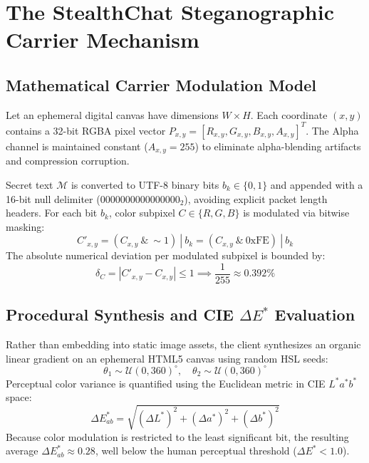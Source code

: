 \documentclass[conference]{IEEEtran}
\begin{document}
\section{The StealthChat Steganographic Carrier Mechanism}

\subsection{Mathematical Carrier Modulation Model}
Let an ephemeral digital canvas have dimensions $W \times H$. Each coordinate $(x,y)$ contains a 32-bit RGBA pixel vector $P_{x,y} = [R_{x,y}, G_{x,y}, B_{x,y}, A_{x,y}]^T$. The Alpha channel is maintained constant ($A_{x,y} = 255$) to eliminate alpha-blending artifacts and compression corruption.

Secret text $\mathcal{M}$ is converted to UTF-8 binary bits $b_k \in \{0, 1\}$ and appended with a 16-bit null delimiter ($0000000000000000_2$), avoiding explicit packet length headers. For each bit $b_k$, color subpixel $C \in \{R, G, B\}$ is modulated via bitwise masking:
\begin{equation}
    C'_{x,y} = (C_{x,y} \ \& \ \sim 1) \ | \ b_k = (C_{x,y} \ \& \ 0\text{xFE}) \ | \ b_k
\end{equation}
The absolute numerical deviation per modulated subpixel is bounded by:
\begin{equation}
    \delta_C = |C'_{x,y} - C_{x,y}| \le 1 \implies \frac{1}{255} \approx 0.392\%
\end{equation}

\subsection{Procedural Synthesis and CIE $\Delta E^*$ Evaluation}
Rather than embedding into static image assets, the client synthesizes an organic linear gradient on an ephemeral HTML5 canvas using random HSL seeds:
\begin{equation}
    \theta_1 \sim \mathcal{U}(0, 360)^\circ, \quad \theta_2 \sim \mathcal{U}(0, 360)^\circ
\end{equation}
Perceptual color variance is quantified using the Euclidean metric in CIE $L^*a^*b^*$ space:
\begin{equation}
    \Delta E^*_{ab} = \sqrt{(\Delta L^*)^2 + (\Delta a^*)^2 + (\Delta b^*)^2}
\end{equation}
Because color modulation is restricted to the least significant bit, the resulting average $\Delta E^*_{ab} \approx 0.28$, well below the human perceptual threshold ($\Delta E^* < 1.0$).
\end{document}
